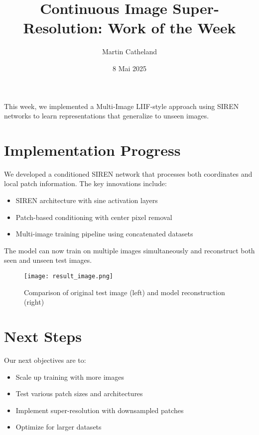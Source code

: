 \documentclass{article}
\begin{document}
\title{Continuous Image Super-Resolution: Work of the Week}
\author{Martin Catheland}
\date{8 Mai 2025}
\maketitle

This week, we implemented a Multi-Image LIIF-style approach using SIREN networks to learn representations that generalize to unseen images.

\section{Implementation Progress}

We developed a conditioned SIREN network that processes both coordinates and local patch information. The key innovations include:

\begin{itemize}
    \item SIREN architecture with sine activation layers
    \item Patch-based conditioning with center pixel removal
    \item Multi-image training pipeline using concatenated datasets
\end{itemize}

The model can now train on multiple images simultaneously and reconstruct both seen and unseen test images.

\begin{figure}[h]
    \centering
    \texttt{[image: result\_image.png]}
    \caption{Comparison of original test image (left) and model reconstruction (right)}
    \label{fig:results}
\end{figure}

\section{Next Steps}

Our next objectives are to:
\begin{itemize}
    \item Scale up training with more images
    \item Test various patch sizes and architectures
    \item Implement super-resolution with downsampled patches
    \item Optimize for larger datasets
\end{itemize}
\end{document}
